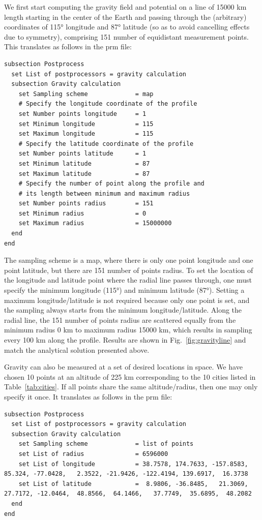 We first start computing the gravity field and potential on a line 
of 15000 \si{km} length starting in the center of the Earth and passing through the (arbitrary) coordinates of 115\si{\degree} longitude and 87\si{\degree} latitude (so as to avoid cancelling effects due to symmetry), comprising 151 number of equidistant measurement points.
This translates as follows in the prm file:
\begin{lstlisting}
subsection Postprocess
  set List of postprocessors = gravity calculation
  subsection Gravity calculation
    set Sampling scheme             = map
    # Specify the longitude coordinate of the profile
    set Number points longitude     = 1
    set Minimum longitude           = 115
    set Maximum longitude           = 115
    # Specify the latitude coordinate of the profile
    set Number points latitude      = 1
    set Minimum latitude            = 87
    set Maximum latitude            = 87
    # Specify the number of point along the profile and 
    # its length between minimum and maximum radius
    set Number points radius        = 151
    set Minimum radius              = 0
    set Maximum radius              = 15000000
  end
end
\end{lstlisting}

The sampling scheme is a map, where there is only one point longitude and one point latitude, but there are 151 number of points radius. To set the location of the longitude and latitude point where the radial line passes through, one must specify the minimum longitude (115\si{\degree}) and minimum latitude (87\si{\degree}). Setting a maximum longitude/latitude is not required because only one point is set, and the sampling always starts from the minimum longitude/latitude. Along the radial line, the 151 number of points radius are scattered equally from the minimum radius 0 \si{km} to maximum radius 15000 \si{km}, which results in sampling every 100 \si{km} along the profile. Results are shown in Fig.~\ref{fig:gravityline} and match the analytical solution presented above. 

Gravity can also be measured at a set of desired locations in space. We have chosen 10 points at an altitude of 225 \si{km} corresponding to the 10 cities listed in Table~\ref{tab:cities}. If all points share the same altitude/radius, then one may only specify it once. It translates as follows in the prm file:

\begin{lstlisting}
subsection Postprocess
  set List of postprocessors = gravity calculation
  subsection Gravity calculation
    set Sampling scheme             = list of points 
    set List of radius              = 6596000
    set List of longitude           = 38.7578, 174.7633, -157.8583,   85.324, -77.0428,   2.3522, -21.9426, -122.4194, 139.6917,  16.3738
    set List of latitude            =  8.9806, -36.8485,   21.3069,  27.7172, -12.0464,  48.8566,  64.1466,   37.7749,  35.6895,  48.2082 
  end
end
\end{lstlisting}

